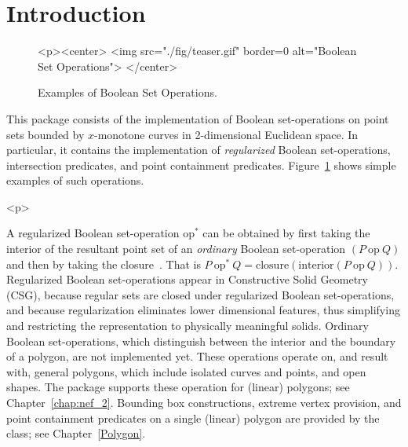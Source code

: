 \newcommand{\reals}{{\rm I\!\hspace{-0.025em} R}}
\newcommand{\calC}{{\cal C}}
\newcommand{\calA}{{\cal A}}
\newcommand{\eps}{{\varepsilon}}
\newcommand{\dcel}{{\sc Dcel}}
\newcommand{\naive}{na\"{\i}ve}
\newcommand{\kdtree}{{\sc Kd}-tree}

\section{Introduction}
\label{bobs_sec:intro}
%
\begin{figure}[!htp]
\begin{ccTexOnly}

\end{ccTexOnly}
\begin{ccHtmlOnly}
  <p><center>
    <img src="./fig/teaser.gif" border=0 alt="Boolean Set Operations">
  </center>
\end{ccHtmlOnly}
\caption{Examples of Boolean Set Operations.} 
\label{fig:teaser}
\end{figure}
This package consists of the implementation of Boolean set-operations
on point sets bounded by $x$-monotone curves in 2-dimensional
Euclidean space. In particular, it contains the implementation of
{\em regularized} Boolean set-operations, intersection predicates, and
point containment predicates. Figure~\ref{fig:teaser} shows simple examples 
of such operations.

\begin{ccHtmlOnly}<p>\end{ccHtmlOnly}
A regularized Boolean set-operation $\mbox{op}^*$ can be obtained by
first taking the interior of the resultant point set of an {\em ordinary}
Boolean set-operation $(P\ \mbox{op}\ Q)$ and then by taking the
closure~\cite{cgal:h-sm-04}. That is
$P\ \mbox{op}^*\ Q = \mbox{closure}(\mbox{interior} (P\ \mbox{op}\ Q))$.
Regularized Boolean set-operations appear in Constructive Solid
Geometry (CSG), because regular sets are closed under regularized
Boolean set-operations, and because regularization eliminates lower
dimensional features, thus simplifying and restricting the
representation to physically meaningful solids.
Ordinary Boolean set-operations, which distinguish between the
interior and the boundary of a polygon, are not implemented yet. These
operations operate on, and result with, general polygons, which
include isolated curves and points, and open shapes. The 
package supports these operation for (linear) polygons; see
Chapter~\ref{chap:nef_2}. Bounding box constructions, extreme vertex
provision, and point containment predicates on a single (linear)
polygon are provided by the  class; see
Chapter~\ref{Polygon}.

